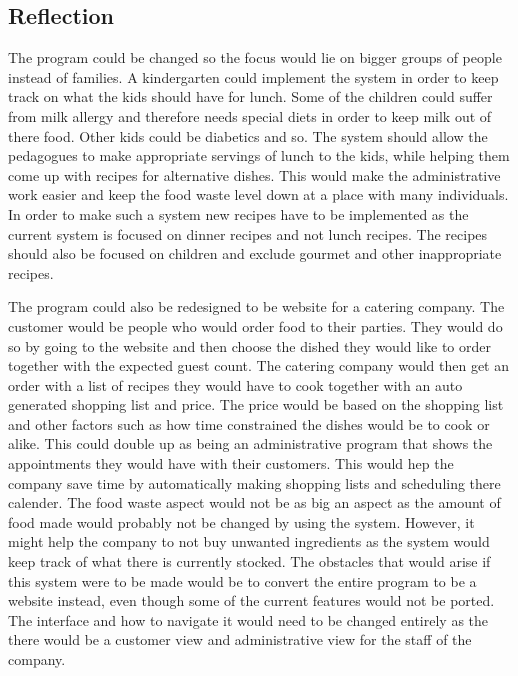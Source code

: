 \subsection{Reflection}
The program could be changed so the focus would lie on bigger groups of people instead of families. A kindergarten could implement the system in order to keep track on what the kids should have for lunch. Some of the children could suffer from milk allergy and therefore needs special diets in order to keep milk out of there food. Other kids could be diabetics and so. The system should allow the pedagogues to make appropriate servings of lunch to the kids, while helping them come up with recipes for alternative dishes. This would make the administrative work easier and keep the food waste level down at a place with many individuals. In order to make such a system new recipes have to be implemented as the current system is focused on dinner recipes and not lunch recipes. The recipes should also be focused on children and exclude gourmet and other inappropriate recipes.

The program could also be redesigned to be website for a catering company. The customer would be people who would order food to their parties. They would do so by going to the website and then choose the dished they would like to order together with the expected guest count. The catering company would then get an order with a list of recipes they would have to cook together with an auto generated shopping list and price. The price would be based on the shopping list and other factors such as how time constrained the dishes would be to cook or alike. This could double up as being an administrative program that shows the appointments they would have with their customers. This would hep the company save time by automatically making shopping lists and scheduling there calender. The food waste aspect would not be as big an aspect as the amount of food made would probably not be changed by using the system. However, it might help the company to not buy unwanted ingredients as the system would keep track of what there is currently stocked. The obstacles that would arise if this system were to be made would be to convert the entire program to be a website instead, even though some of the current features would not be ported. The interface and how to navigate it would need to be changed entirely as the there would be a customer view and administrative view for the staff of the company. 